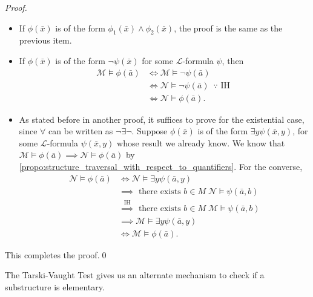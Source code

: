 \documentclass[notoc,notitlepage]{tufte-book}
\begin{document}
\begin{proof}
\begin{itemize}
      \item If $\phi(\bar{x})$ is of the form $\phi_1(\bar{x}) \land \phi_2(\bar{x})$, the proof is the same as the previous item.
      \item If $\phi(\bar{x})$ is of the form $\neg \psi(\bar{x})$ for some $\mathcal{L}$-formula $\psi$, then
        \begin{align*}
          \mathcal{M} \models \phi(\bar{a}) &\iff \mathcal{M} \models \neg \psi(\bar{a}) \\
                                            &\iff \mathcal{N} \models \neg \psi(\bar{a}) \enspace \because \text{ IH } \\
                                            &\iff \mathcal{N} \models \phi(\bar{a}).
        \end{align*}

      \item As stated before in another proof, it suffices to prove for the existential case, since $\forall$ can be written as $\neg \exists \neg$. Suppose $\phi(\bar{x})$ is of the form $\exists y \psi(\bar{x}, y)$, for some $\mathcal{L}$-formula $\psi(\bar{x}, y)$ whose result we already know. We know that $\mathcal{M} \models \phi(\bar{a}) \implies \mathcal{N} \models \phi(\bar{a})$ by \cref{propo:structure_traversal_with_respect_to_quantifiers}. For the converse,
        \begin{align*}
          \mathcal{N} \models \phi(\bar{a}) &\iff \mathcal{N} \models \exists y \psi(\bar{a}, y) \\
                                            &\implies \text{ there exists } b \in M \; \mathcal{N} \models \psi(\bar{a}, b) \\
                                            &\overset{\text{IH}}{\implies} \text{ there exists } b \in M \; \mathcal{M} \models \psi(\bar{a}, b) \\
                                            &\implies \mathcal{M} \models \exists y \psi(\bar{a}, y) \\
                                            &\iff \mathcal{M} \models \phi(\bar{a}).
        \end{align*}
    \end{itemize}

    This completes the proof.\qed\
\end{proof}

\begin{remark}
  The Tarski-Vaught Test gives us an alternate mechanism to check if a substructure is elementary.
\end{remark}
\end{document}
